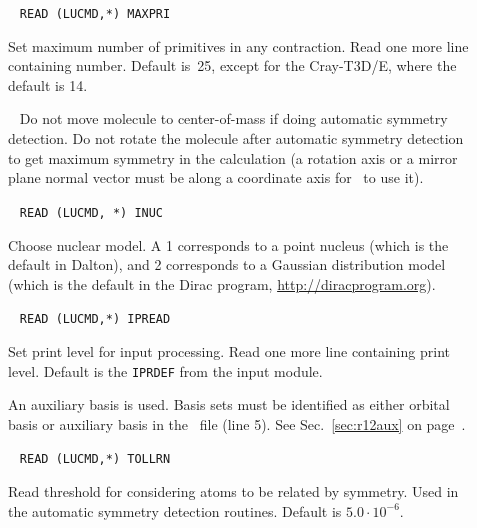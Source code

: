 \begin{description}
\item[]\verb| |\newline
\verb|READ (LUCMD,*) MAXPRI|

Set maximum number of primitives in any
contraction.  Read one more line containing number.  Default
is~25, except for the Cray-T3D/E, where the default is 14.


\item[]\verb| |\newline
Do not move molecule to center-of-mass if doing automatic symmetry detection.
Do not rotate the molecule after automatic symmetry detection to get maximum symmetry in the calculation
(a rotation axis or a mirror plane normal vector must be along a coordinate axis for \dalton\ to use it).

\item[]\verb| |\newline
\verb|READ (LUCMD, *) INUC|

Choose nuclear model.
A 1 corresponds to a point nucleus (which is the default in Dalton),
and 2 corresponds to a Gaussian distribution model (which is the default in the Dirac program, \url{http://diracprogram.org}).

\item[]\verb| |\newline
\verb|READ (LUCMD,*) IPREAD|

Set print level for input processing.  Read one more line containing
print level. Default is the \verb|IPRDEF| from the  input
module.

\item[] An auxiliary basis is used.
Basis sets must be identified as either orbital basis or
auxiliary basis in the \molinp\ file (line 5).
See Sec.~\ref{sec:r12aux} on page~\pageref{sec:r12aux}.

\item[]\verb| |\newline
\verb|READ (LUCMD,*) TOLLRN|

Read threshold for considering atoms to be related by symmetry. Used
in the automatic symmetry detection routines. Default is $5.0\cdot
10^{-6}$.

\item[]


\end{description}
